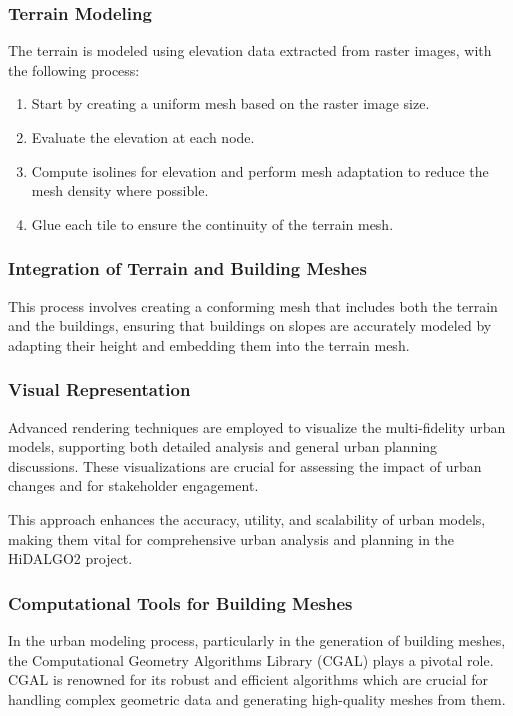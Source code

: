 \documentclass[runningheads]{llncs}
\begin{document}
\subsubsection{Terrain Modeling}
The terrain is modeled using elevation data extracted from raster images, with the following process:
\begin{enumerate}
    \item Start by creating a uniform mesh based on the raster image size.
    \item Evaluate the elevation at each node.
    \item Compute isolines for elevation and perform mesh adaptation to reduce the mesh density where possible.
    \item Glue each tile to ensure the continuity of the terrain mesh.
\end{enumerate}

\subsubsection{Integration of Terrain and Building Meshes}
This process involves creating a conforming mesh that includes both the terrain and the buildings, ensuring that buildings on slopes are accurately modeled by adapting their height and embedding them into the terrain mesh.

\subsubsection{Visual Representation}
Advanced rendering techniques are employed to visualize the multi-fidelity urban models, supporting both detailed analysis and general urban planning discussions. These visualizations are crucial for assessing the impact of urban changes and for stakeholder engagement.

This approach enhances the accuracy, utility, and scalability of urban models, making them vital for comprehensive urban analysis and planning in the HiDALGO2 project.

\subsubsection{Computational Tools for Building Meshes}

In the urban modeling process, particularly in the generation of building meshes, the Computational Geometry Algorithms Library (CGAL) plays a pivotal role. CGAL is renowned for its robust and efficient algorithms which are crucial for handling complex geometric data and generating high-quality meshes from them.
\end{document}
